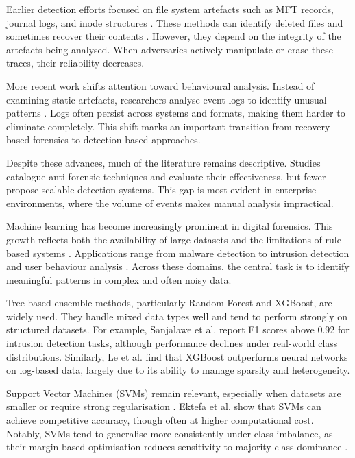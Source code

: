 Earlier detection efforts focused on file system artefacts such as MFT records, journal logs, and inode structures \cite{ref26}. These methods can identify deleted files and sometimes recover their contents \cite{ref27}. However, they depend on the integrity of the artefacts being analysed. When adversaries actively manipulate or erase these traces, their reliability decreases.

More recent work shifts attention toward behavioural analysis. Instead of examining static artefacts, researchers analyse event logs to identify unusual patterns \cite{ref28}. Logs often persist across systems and formats, making them harder to eliminate completely. This shift marks an important transition from recovery-based forensics to detection-based approaches.

Despite these advances, much of the literature remains descriptive. Studies catalogue anti-forensic techniques and evaluate their effectiveness, but fewer propose scalable detection systems. This gap is most evident in enterprise environments, where the volume of events makes manual analysis impractical.

Machine learning has become increasingly prominent in digital forensics. This growth reflects both the availability of large datasets and the limitations of rule-based systems \cite{ref9}. Applications range from malware detection \cite{ref17} to intrusion detection \cite{ref29} and user behaviour analysis \cite{ref30}. Across these domains, the central task is to identify meaningful patterns in complex and often noisy data.

Tree-based ensemble methods, particularly Random Forest and XGBoost, are widely used. They handle mixed data types well and tend to perform strongly on structured datasets. For example, Sanjalawe et al. \cite{ref32} report F1 scores above 0.92 for intrusion detection tasks, although performance declines under real-world class distributions. Similarly, Le et al. \cite{ref33} find that XGBoost outperforms neural networks on log-based data, largely due to its ability to manage sparsity and heterogeneity.

Support Vector Machines (SVMs) remain relevant, especially when datasets are smaller or require strong regularisation \cite{ref34}. Ektefa et al. \cite{ref35} show that SVMs can achieve competitive accuracy, though often at higher computational cost. Notably, SVMs tend to generalise more consistently under class imbalance, as their margin-based optimisation reduces sensitivity to majority-class dominance \cite{ref36}.

